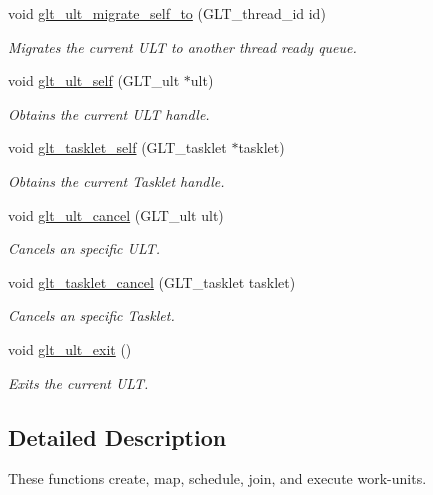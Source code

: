 \begin{DoxyCompactItemize}
void \hyperlink{group__WORKUNIT_ga543ea1b8d0351394a59613845a68f540}{glt\-\_\-ult\-\_\-migrate\-\_\-self\-\_\-to} (G\-L\-T\-\_\-thread\-\_\-id id)
\begin{DoxyCompactList}\small\item\em Migrates the current U\-L\-T to another thread ready queue. \end{DoxyCompactList}\item 
void \hyperlink{group__WORKUNIT_ga5f5f047114b71a62a163f54654576cc2}{glt\-\_\-ult\-\_\-self} (G\-L\-T\-\_\-ult $\ast$ult)
\begin{DoxyCompactList}\small\item\em Obtains the current U\-L\-T handle. \end{DoxyCompactList}\item 
void \hyperlink{group__WORKUNIT_gac10751fbab2f7a71643c953d37acd0ee}{glt\-\_\-tasklet\-\_\-self} (G\-L\-T\-\_\-tasklet $\ast$tasklet)
\begin{DoxyCompactList}\small\item\em Obtains the current Tasklet handle. \end{DoxyCompactList}\item 
void \hyperlink{group__WORKUNIT_ga1e92677c1a0b68ce201dd42a88088167}{glt\-\_\-ult\-\_\-cancel} (G\-L\-T\-\_\-ult ult)
\begin{DoxyCompactList}\small\item\em Cancels an specific U\-L\-T. \end{DoxyCompactList}\item 
void \hyperlink{group__WORKUNIT_ga84a1d0464521ac71a2d80bef936d4855}{glt\-\_\-tasklet\-\_\-cancel} (G\-L\-T\-\_\-tasklet tasklet)
\begin{DoxyCompactList}\small\item\em Cancels an specific Tasklet. \end{DoxyCompactList}\item 
void \hyperlink{group__WORKUNIT_ga2990e147448d30c94e0283e93aeb2d25}{glt\-\_\-ult\-\_\-exit} ()
\begin{DoxyCompactList}\small\item\em Exits the current U\-L\-T. \end{DoxyCompactList}\end{DoxyCompactItemize}


\subsection{Detailed Description}
These functions create, map, schedule, join, and execute work-\/units. 

